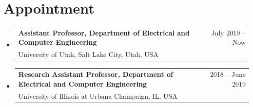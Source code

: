 \documentclass[A4,11pt]{article}
\makeatletter
\newcommand{\CVItem}[1]{
  \item\small{
    {#1 \vspace{-2pt}}
  }
}
\newcommand{\CVSubheading}[4]{
  \vspace{-2pt}\item
    \begin{tabular*}{0.97\textwidth}[t]{l@{\extracolsep{\fill}}r}
      \textbf{#1} & #2 \\
      \small#3 & \small #4 \\
    \end{tabular*}\vspace{-7pt}
}
\newcommand{\CVSubHeadingListStart}{\begin{itemize}[leftmargin=0.5cm, label={}]}
\newcommand{\CVSubHeadingListEnd}{\end{itemize}}
\newcommand{\CVItemListStart}{\begin{itemize}}
\newcommand{\CVItemListEnd}{\end{itemize}\vspace{-5pt}}
\makeatother
\begin{document}

\section{Appointment}
  \CVSubHeadingListStart
    \CVSubheading
      {{Assistant Professor, Department of Electrical and Computer Engineering}}{July 2019 -- Now}
      {University of Utah, Salt Lake City, Utah, USA}{}
    \CVSubheading
      {{Research Assistant Professor, Department of Electrical and Computer Engineering}}{2018 -- June 2019}
      {University of Illinois at Urbana-Champaign, IL, USA}{}
  \CVSubHeadingListEnd

\end{document}
